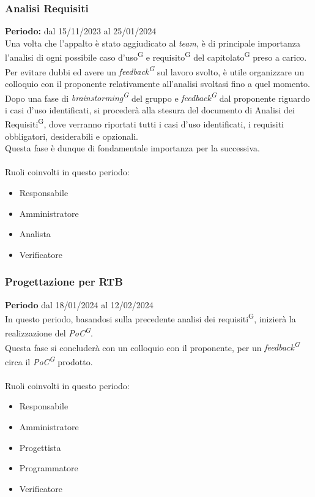 \documentclass[5pt]{article}
\begin{document}
    
    \subsubsection{Analisi Requisiti}
      \textbf{Periodo:} dal 15/11/2023 al 25/01/2024 
      \vspace{0.3cm} \\
      Una volta che l'appalto è stato aggiudicato al \textit{team}, è di principale importanza l'analisi di ogni possibile caso d'uso\textsuperscript{G} e requisito\textsuperscript{G} del capitolato\textsuperscript{G} preso a carico.
      Per evitare dubbi ed avere un \textit{feedback\textsuperscript{G}} sul lavoro svolto, è utile organizzare un colloquio con il proponente relativamente all'analisi svoltasi fino a quel momento. \\
      Dopo una fase di \textit{brainstorming\textsuperscript{G}} del gruppo e \textit{feedback\textsuperscript{G}} dal proponente riguardo i casi d'uso identificati, si procederà alla stesura del documento di Analisi dei Requisiti\textsuperscript{G},
      dove verranno riportati tutti i casi d'uso identificati, i requisiti obbligatori, desiderabili e opzionali. \\
      Questa fase è dunque di fondamentale importanza per la successiva.\\\\
      Ruoli coinvolti in questo periodo:
      \begin{itemize}
          \item Responsabile
          \item Amministratore
          \item Analista
          \item Verificatore
      \end{itemize}
    
    \subsubsection{Progettazione per RTB}
      \textbf{Periodo} dal 18/01/2024 al 12/02/2024 
      \vspace{0.3cm} \\
      In questo periodo, basandosi sulla precedente analisi dei requisiti\textsuperscript{G}, inizierà la realizzazione del \textit{PoC\textsuperscript{G}}. \\
      Questa fase si concluderà con un colloquio con il proponente, per un \textit{feedback\textsuperscript{G}} circa il \textit{PoC\textsuperscript{G}} prodotto.\\\\
      Ruoli coinvolti in questo periodo:
      \begin{itemize}
          \item Responsabile
          \item Amministratore
          \item Progettista
          \item Programmatore
          \item Verificatore
      \end{itemize}
\end{document}

